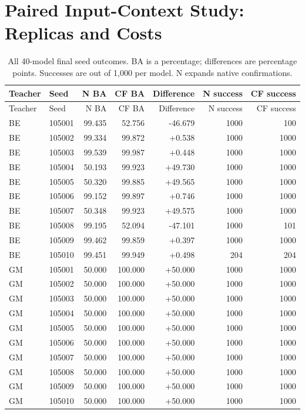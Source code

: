 \section{Paired Input-Context Study: Replicas and Costs}\label{app:prospective}

\begin{longtable}{llrrrrr}
\caption{All 40-model final seed outcomes. BA is a percentage; differences are
percentage points. Successes are out of 1,000 per model. N expands native confirmations.}\\
\toprule Teacher & Seed & N BA & CF BA & Difference & N success & CF success \\
\midrule\endfirsthead
\toprule Teacher & Seed & N BA & CF BA & Difference & N success & CF success \\
\midrule\endhead
BE & 105001 & 99.435 & 52.756 & -46.679 & 1000 & 100 \\
BE & 105002 & 99.334 & 99.872 & +0.538 & 1000 & 1000 \\
BE & 105003 & 99.539 & 99.987 & +0.448 & 1000 & 1000 \\
BE & 105004 & 50.193 & 99.923 & +49.730 & 1000 & 1000 \\
BE & 105005 & 50.320 & 99.885 & +49.565 & 1000 & 1000 \\
BE & 105006 & 99.152 & 99.897 & +0.746 & 1000 & 1000 \\
BE & 105007 & 50.348 & 99.923 & +49.575 & 1000 & 1000 \\
BE & 105008 & 99.195 & 52.094 & -47.101 & 1000 & 101 \\
BE & 105009 & 99.462 & 99.859 & +0.397 & 1000 & 1000 \\
BE & 105010 & 99.451 & 99.949 & +0.498 & 204 & 204 \\
GM & 105001 & 50.000 & 100.000 & +50.000 & 1000 & 1000 \\
GM & 105002 & 50.000 & 100.000 & +50.000 & 1000 & 1000 \\
GM & 105003 & 50.000 & 100.000 & +50.000 & 1000 & 1000 \\
GM & 105004 & 50.000 & 100.000 & +50.000 & 1000 & 1000 \\
GM & 105005 & 50.000 & 100.000 & +50.000 & 1000 & 1000 \\
GM & 105006 & 50.000 & 100.000 & +50.000 & 1000 & 1000 \\
GM & 105007 & 50.000 & 100.000 & +50.000 & 1000 & 1000 \\
GM & 105008 & 50.000 & 100.000 & +50.000 & 1000 & 1000 \\
GM & 105009 & 50.000 & 100.000 & +50.000 & 1000 & 1000 \\
GM & 105010 & 50.000 & 100.000 & +50.000 & 1000 & 1000 \\
\bottomrule
\end{longtable}


